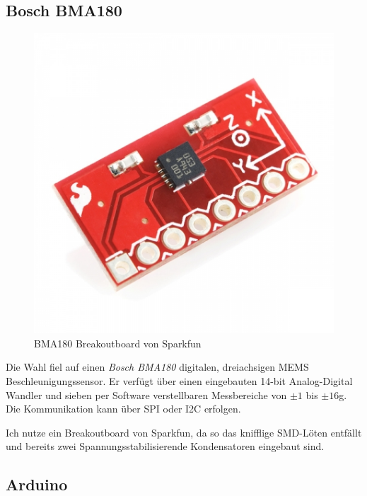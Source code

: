 \documentclass[12pt,a4paper]{scrartcl}
\begin{document}
\subsection{Bosch BMA180}
\begin{figure}[h]
\centering
\includegraphics[scale=.4]{hardwareimages/bma180_breakout.jpg}
\caption{BMA180 Breakoutboard von Sparkfun}
\label{bma180_breakout}
\end{figure}

Die Wahl fiel auf einen \textit{Bosch BMA180} digitalen, dreiachsigen MEMS Beschleunigungssensor. Er verfügt über einen eingebauten 14-bit Analog-Digital Wandler und sieben per Software verstellbaren Messbereiche von $\pm1$ bis $\pm16$g.
Die Kommunikation kann über SPI oder I2C erfolgen.

Ich nutze ein Breakoutboard von Sparkfun, da so das knifflige SMD-Löten entfällt und bereits zwei Spannungsstabilisierende Kondensatoren eingebaut sind.

\subsection{Arduino}
\end{document}
